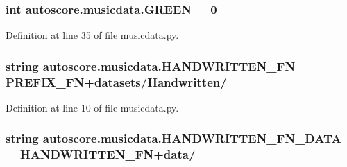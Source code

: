 \subsubsection[{\texorpdfstring{G\+R\+E\+EN}{GREEN}}]{\setlength{\rightskip}{0pt plus 5cm}int autoscore.\+musicdata.\+G\+R\+E\+EN = 0}\hypertarget{namespaceautoscore_1_1musicdata_af0a6b998fc1cb73188462d6dc9dc9719}{}\label{namespaceautoscore_1_1musicdata_af0a6b998fc1cb73188462d6dc9dc9719}


Definition at line 35 of file musicdata.\+py.

\subsubsection[{\texorpdfstring{H\+A\+N\+D\+W\+R\+I\+T\+T\+E\+N\+\_\+\+FN}{HANDWRITTEN_FN}}]{\setlength{\rightskip}{0pt plus 5cm}string autoscore.\+musicdata.\+H\+A\+N\+D\+W\+R\+I\+T\+T\+E\+N\+\_\+\+FN = {\bf P\+R\+E\+F\+I\+X\+\_\+\+FN}+\textquotesingle{}datasets/Handwritten/\textquotesingle{}}\hypertarget{namespaceautoscore_1_1musicdata_af9a3c9c8a04c4a8459cff06c8d91a202}{}\label{namespaceautoscore_1_1musicdata_af9a3c9c8a04c4a8459cff06c8d91a202}


Definition at line 10 of file musicdata.\+py.

\subsubsection[{\texorpdfstring{H\+A\+N\+D\+W\+R\+I\+T\+T\+E\+N\+\_\+\+F\+N\+\_\+\+D\+A\+TA}{HANDWRITTEN_FN_DATA}}]{\setlength{\rightskip}{0pt plus 5cm}string autoscore.\+musicdata.\+H\+A\+N\+D\+W\+R\+I\+T\+T\+E\+N\+\_\+\+F\+N\+\_\+\+D\+A\+TA = {\bf H\+A\+N\+D\+W\+R\+I\+T\+T\+E\+N\+\_\+\+FN}+\textquotesingle{}data/\textquotesingle{}}\hypertarget{namespaceautoscore_1_1musicdata_a323dfa7bb6acca22309294f911611ce1}{}\label{namespaceautoscore_1_1musicdata_a323dfa7bb6acca22309294f911611ce1}


